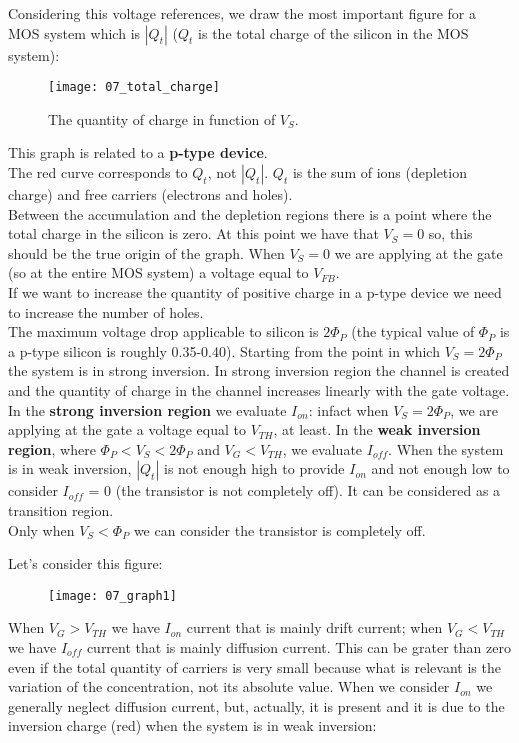 \documentclass[a4paper, 12pt, twoside, openright]{report}
\begin{document}
Considering this voltage references, we draw the most important figure for a MOS system which is $|Q_t|$ ($Q_{t}$ is the total charge of the silicon in the MOS system):

	\begin{figure}[H]
	\centering
	\texttt{[image: 07\_total\_charge]}
	\caption{The quantity of charge in function of $V_{S}$.}
	\label{}
	\end{figure}

This graph is related to a \textbf{p-type device}.\\
The red curve corresponds to $Q_{t}$, not $|Q_{t}|$. $Q_{t}$ is the sum of ions (depletion charge) and free carriers (electrons and holes).\\
Between the accumulation and the depletion regions there is a point where the total charge in the silicon is zero. At this point we have that $V_S = 0$ so, this should be the true origin of the graph. When $V_S = 0$ we are applying at the gate (so at the entire MOS system) a voltage equal to $V_{FB}$.\\
If we want to increase the quantity of positive charge in a p-type device we need to increase the number of holes.\\
The maximum voltage drop applicable to silicon is $2\Phi_P$ (the typical value of $\Phi_P$ is a p-type silicon is roughly 0.35-0.40). Starting from the point in which $V_S = 2\Phi_P$ the system is in strong inversion. In strong inversion region the channel is created and the quantity of charge in the channel increases linearly with the gate voltage. In the \textbf{strong inversion region} we evaluate $I_{on}$: infact when $V_S = 2\Phi_P$, we are applying at the gate a voltage equal to $V_{TH}$, at least. In the \textbf{weak inversion region}, where $ \Phi_P < V_S < 2\Phi_P$ and $V_G < V_{TH}$, we evaluate $I_{off}$. When the system is in weak inversion, $|Q_{t}|$ is not enough high to provide $I_{on}$ and not enough low to consider $I_{off}$ = 0 (the transistor is not completely off). It can be considered as a transition region.\\
Only when $V_S < \Phi_P$ we can consider the transistor is completely off.

Let's consider this figure:

	\begin{figure}[H]
	\centering
	\texttt{[image: 07\_graph1]}
	\caption{}
	\label{}
	\end{figure}

When $V_G > V_{TH}$ we have $I_{on}$ current that is mainly drift current; when $V_G < V_{TH}$ we have $I_{off}$ current that is mainly diffusion current. This can be grater than zero even if the total quantity of carriers is very small because what is relevant is the variation of the concentration, not its absolute value. When we consider $I_{on}$ we generally neglect diffusion current, but, actually, it is present and it is due to the inversion charge (red) when the system is in weak inversion:
\end{document}
